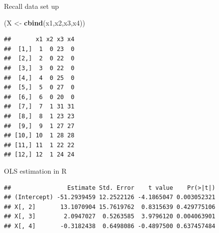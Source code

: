 \documentclass[
  ignorenonframetext,
]{beamer}
\newenvironment{Shaded}{\begin{snugshade}}{\end{snugshade}}
\newcommand{\CommentTok}[1]{\textcolor[rgb]{0.56,0.35,0.01}{\textit{#1}}}
\newcommand{\DecValTok}[1]{\textcolor[rgb]{0.00,0.00,0.81}{#1}}
\newcommand{\KeywordTok}[1]{\textcolor[rgb]{0.13,0.29,0.53}{\textbf{#1}}}
\newcommand{\NormalTok}[1]{#1}
\newcommand{\OperatorTok}[1]{\textcolor[rgb]{0.81,0.36,0.00}{\textbf{#1}}}
\newcommand{\StringTok}[1]{\textcolor[rgb]{0.31,0.60,0.02}{#1}}
\begin{document}
\begin{frame}[fragile]{Recall data set up}
\protect\hypertarget{recall-data-set-up-2}{}

\footnotesize

\begin{Shaded}
\begin{Highlighting}[]
\NormalTok{(X <-}\StringTok{ }\KeywordTok{cbind}\NormalTok{(x1,x2,x3,x4))}
\end{Highlighting}
\end{Shaded}

\begin{verbatim}
##       x1 x2 x3 x4
##  [1,]  1  0 23  0
##  [2,]  2  0 22  0
##  [3,]  3  0 22  0
##  [4,]  4  0 25  0
##  [5,]  5  0 27  0
##  [6,]  6  0 20  0
##  [7,]  7  1 31 31
##  [8,]  8  1 23 23
##  [9,]  9  1 27 27
## [10,] 10  1 28 28
## [11,] 11  1 22 22
## [12,] 12  1 24 24
\end{verbatim}

\end{frame}

\begin{frame}[fragile]{OLS estimation in R}
\protect\hypertarget{ols-estimation-in-r}{}

\footnotesize

\begin{Shaded}
\end{Shaded}

\begin{verbatim}
##                Estimate Std. Error    t value    Pr(>|t|)
## (Intercept) -51.2939459 12.2522126 -4.1865047 0.003052321
## X[, 2]       13.1070904 15.7619762  0.8315639 0.429775106
## X[, 3]        2.0947027  0.5263585  3.9796120 0.004063901
## X[, 4]       -0.3182438  0.6498086 -0.4897500 0.637457484
\end{verbatim}

\end{frame}
\end{document}
